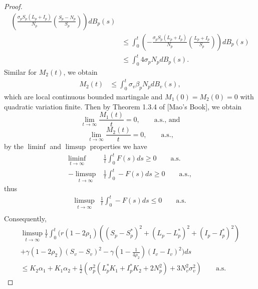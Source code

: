 \begin{proof}
\begin{align*}
	 		\left( 
	 			\frac{
	 				\sigma_p S_p
	 				\left(
	 					L_p + I_p
	 				\right)
	 			}{N_p}
	 			\left(
	 				\frac{S_p-N_p}{S_p} 
	 			\right) 
	 		\right) 
	 		dB_p(s)
	 	\\
	 	&\leq
	 		\int_{0}^{t}
	 		\left(
	 		 	-
	 		 	\frac{
	 		 		\sigma_p S_p
	 		 		\left(
	 		 			 L_p + I_p 
	 		 		\right)
	 		 	}{N_p}
	 		 	\left(
	 		 		\frac{L_p + I_p}{S_p}
	 		 	\right) 
	 		 \right) dB_p(s)
	 	\\
	 	&\leq
	 		\int_{0}^{t}
	 		4\sigma_p N_p dB_p(s).
	\end{align*}
	Similar for $M_2(t)$, we obtain
	 \begin{align*}
	 	M_2(t) &\leq
	 		\int_{0}^{t}\sigma_v\beta_pN_p dB_v(s),
	\end{align*}
	which are local continuous bounded martingale and $M_1(0)=M_2(0)=0$ with 
	quadratic variation finite. Then by Theorem 1.3.4 of [Mao's Book], we 
	obtain
	 \begin{equation*}
	 	\lim
	 	\limits_{t \to \infty}
	 		\frac{M_1(t)}{t} = 0,
	 		\qquad \mbox{a.s., and}
	 \end{equation*}
	\begin{equation*}
	 	\lim 
	 		\limits_{t\to \infty}
	 		\frac{M_2(t)}{t} = 0,
	 		\qquad \mbox{a.s.,}
	\end{equation*}
	by the $\liminf$ and $\limsup$ properties we have 
	\begin{align*}
	 	\liminf
	 	\limits_{t \to \infty} & 
	 	\frac{1}{t}
	 	\int_{0}^{t}
	 		F(s)ds 
	 	\geq 0 \qquad \mbox{a.s.}
	 	\\
	 	-\limsup_{t\to\infty}
	 	&
	 		\frac{1}{t}
	 		\int_{0} ^ {t}
	 			-F(s) ds \geq 
	 			0\qquad \mbox{a.s.},
	\end{align*}
	thus
	\begin{align*}
	 	\limsup_{t\to \infty}
	 	&
	 		\frac{1}{t}
	 		\int_{0} ^ {t} - 
	 		F(s)ds \leq 0
	 		\qquad \mbox{a.s.}
	 	\\
	\end{align*}
	Consequently,
	\begin{multline*}
	 	\limsup
	 	\limits_{t \to 	\infty}
	 	\frac{1}{t}
	 	\int_{0}^{t}
	 		(
	 			r
	 			\left(
	 				1 - 2 \rho_1
	 			\right)
	 			\left(
	 				(S_p - S_p ^*) ^ 2 + 
	 				(L_p - L_p ^*) ^ 2 +
	 				(I_p - I_p ^*) ^ 2
	 			\right)
	 	\\
	 	+
	 		\gamma
	 		\left(
	 			1 - 2 \rho_2
	 		\right)
	 		(S_v - S_v) ^ 2 - 
	 		\gamma
	 		\left( 1 - 
	 			\frac{1}{4\rho_2}
	 		\right)(I_v-I_v)^2)
	 		ds
	 	\\
	 	\leq
	 		K_2
	 		\alpha_1 + 
	 		K_1 \alpha_2 + 
	 		\frac{1}{2}
	 		\left(
	 			\sigma_p^2(
	 				L_p ^* K_1 + 
	 				I_p ^ *K_2 + 
	 				2N_p^2
	 			) + 
	 			3 N_v ^ 2
	 			\sigma_v ^ 2
	 		\right)
	 	\qquad 
	 	\mbox{a.s.}
 	\end{multline*}
 \end{proof}
